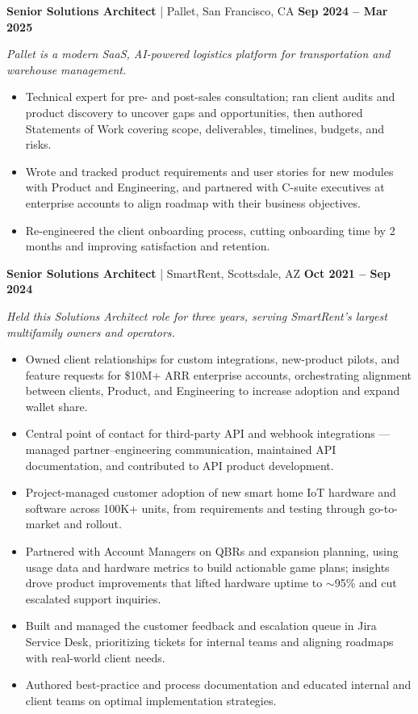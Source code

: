 \documentclass[10pt,letterpaper]{article}
\newcommand{\role}[4]{%
  \vspace{4pt}%
  {\textbf{#2} \textcolor{rulegray}{|} #1 \hfill \textbf{#3}}\par
  {\small\itshape #4\par}}
\newenvironment{roleblock}{\par\begin{minipage}{\textwidth}}{\end{minipage}\par\vspace{7pt}}
\begin{document}
\begin{roleblock}
\role{Pallet, San Francisco, CA}{Senior Solutions Architect}{Sep 2024 -- Mar 2025}
{Pallet is a modern SaaS, AI-powered logistics platform for transportation and warehouse management.}
\begin{itemize}
  \item Technical expert for pre- and post-sales consultation; ran client audits and product discovery to uncover gaps and opportunities, then authored Statements of Work covering scope, deliverables, timelines, budgets, and risks.
  \item Wrote and tracked product requirements and user stories for new modules with Product and Engineering, and partnered with C-suite executives at enterprise accounts to align roadmap with their business objectives.
  \item Re-engineered the client onboarding process, cutting onboarding time by 2 months and improving satisfaction and retention.
\end{itemize}
\end{roleblock}

\begin{roleblock}
\role{SmartRent, Scottsdale, AZ}{Senior Solutions Architect}{Oct 2021 -- Sep 2024}
{Held this Solutions Architect role for three years, serving SmartRent's largest multifamily owners and operators.}
\begin{itemize}
  \item Owned client relationships for custom integrations, new-product pilots, and feature requests for \$10M+ ARR enterprise accounts, orchestrating alignment between clients, Product, and Engineering to increase adoption and expand wallet share.
  \item Central point of contact for third-party API and webhook integrations — managed partner--engineering communication, maintained API documentation, and contributed to API product development.
  \item Project-managed customer adoption of new smart home IoT hardware and software across 100K+ units, from requirements and testing through go-to-market and rollout.
  \item Partnered with Account Managers on QBRs and expansion planning, using usage data and hardware metrics to build actionable game plans; insights drove product improvements that lifted hardware uptime to $\sim$95\% and cut escalated support inquiries.
  \item Built and managed the customer feedback and escalation queue in Jira Service Desk, prioritizing tickets for internal teams and aligning roadmaps with real-world client needs.
  \item Authored best-practice and process documentation and educated internal and client teams on optimal implementation strategies.
\end{itemize}
\end{roleblock}
\end{document}
